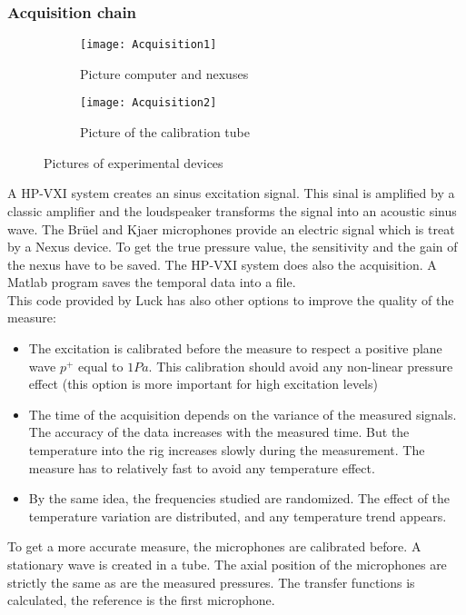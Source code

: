 \subsubsection{Acquisition chain}
\begin{figure}[H] \centering
    \begin{subfigure}{.5\textwidth}\centering
     \texttt{[image: Acquisition1]}
     \caption{Picture computer and nexuses}
    \end{subfigure}%
    \begin{subfigure}{.5\textwidth}\centering
     \texttt{[image: Acquisition2]}  
      \caption{Picture of the  calibration tube}
    \end{subfigure}
    \caption{Pictures of experimental devices}
\end{figure}
\noindent A HP-VXI system creates an sinus excitation signal. This sinal is amplified by a classic amplifier and the loudspeaker transforms the signal into an acoustic sinus wave. The Brüel and Kjaer microphones provide an electric signal which is treat by a Nexus device. To get the true pressure value, the sensitivity and the gain of the nexus have to be saved. The HP-VXI system does also the acquisition. A Matlab program saves the temporal data into a file.\\
This code provided by Luck \cite{Luck_thesis} has also other options to improve the quality of the measure:
\begin{itemize}
    \item The excitation is calibrated before the measure to respect a positive plane wave $p^+$ equal to $1Pa$. This calibration should avoid any non-linear pressure effect (this option is more important for high excitation levels)
    \item The time of the acquisition depends on the variance of the measured signals. The accuracy of the data increases with the measured time. But the temperature into the rig increases slowly during the measurement. The measure has to relatively fast to avoid any temperature effect.
    \item By the same idea, the frequencies studied are randomized. The effect of the temperature variation are distributed, and any temperature trend appears.
\end{itemize}
To get a more accurate measure, the microphones are calibrated before. A stationary wave is created in a tube. The axial position of the microphones are strictly the same as are the measured pressures. The transfer functions is calculated, the reference is the first microphone.
